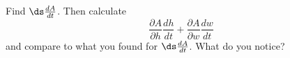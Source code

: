 \begin{pa}
\begin{comment}

When $t$ is close to 0, $h(t) \approx L_h(t)$ and $w(t) \approx L_w(t)$, and these approximations get better as $t$ gets closer to 0. So for $(h,w)$ close to $(a,b)$ (that is, $t$ close to 0), we can think of $A$ as a function of $t$ by
\[A = A(h(t),w(t)) \approx A(L_h(t), L_w(t)) = A(60+100t,9+16t) = 0.0072 (60+100t)^{0.725}(9+16t)^{0.425}.\]



\end{comment}

    \item Find $\ds \frac{dA}{dt}$. Then calculate
\[\frac{\partial A}{\partial h} \frac{dh}{dt} + \frac{\partial A}{\partial w} \frac{dw}{dt}\]
and compare to what you found for $\ds \frac{dA}{dt}$. What do you notice?




\begin{comment}

To find $\frac{dA}{dt}$ we need to use our formula for $A$ as a function of $t$ and differentiate with the product and chain rules:
\begin{align}
\frac{dA}{dt}\biggm|_{(60,9)} &= 0.0072\left[(9+16t)^{0.425}(0.725)(60+100t)^{-0.275}(100) + (60+100t)^{0.725}(0.425)(9+16t)^{-0.575}(16)\biggm|_{t=0} \label{eq:CR_PA} \\
    &\approx 0.7 \ \frac{\text{m}^2}{\text{year}}. \notag
\end{align}
Now
\[\frac{partial A}{\partial h} = 0.0072(0.725)h^{-0.275}w^{0.425} \ \ \text{ and } \ \ \frac{partial A}{\partial w} = 0.0072(0.425)h^{0.725}w^{-0.575},\]
so
\[\frac{\partial A}{\partial h} \frac{dh}{dt} + \frac{\partial A}{\partial w} \frac{dw}{dt} = 0.0072(0.725)h^{-0.275}w^{0.425}(100) + 0.0072(0.425)h^{0.725}w^{-0.575}(16).\]
This is essentially what we obtained in (\ref{eq:CR_PA}).



\end{comment}

	\ea

\end{pa} \afterpa 